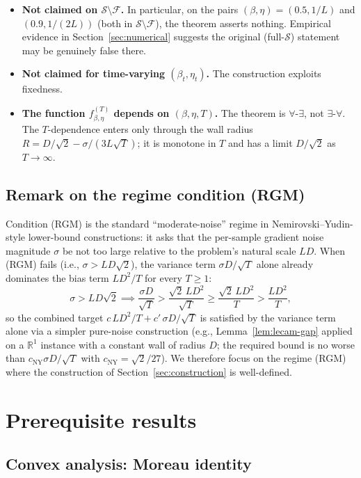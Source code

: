 \documentclass[11pt]{article}
\theoremstyle{definition}
\theoremstyle{remark}
\begin{document}
\begin{itemize}
\item \textbf{Not claimed on $\mathcal{S}\setminus\mathcal{F}$.} In particular, on the pairs $(\beta, \eta) = (0.5, 1/L)$ and $(0.9, 1/(2L))$ (both in $\mathcal{S}\setminus\mathcal{F}$), the theorem asserts nothing. Empirical evidence in Section~\ref{sec:numerical} suggests the original (full-$\mathcal{S}$) statement may be genuinely false there.
\item \textbf{Not claimed for time-varying $(\beta_t, \eta_t)$.} The construction exploits fixedness.
\item \textbf{The function $f_{\beta,\eta}^{(T)}$ depends on $(\beta, \eta, T)$.} The theorem is $\forall$-$\exists$, not $\exists$-$\forall$. The $T$-dependence enters only through the wall radius $R = D/\sqrt 2 - \sigma/(3L\sqrt T)$; it is monotone in $T$ and has a limit $D/\sqrt 2$ as $T \to \infty$.
\end{itemize}

\subsection{Remark on the regime condition (RGM)}

Condition (RGM) is the standard ``moderate-noise'' regime in Nemirovski--Yudin-style lower-bound constructions: it asks that the per-sample gradient noise magnitude $\sigma$ be not too large relative to the problem's natural scale $LD$. When (RGM) fails (i.e., $\sigma > LD\sqrt 2$), the variance term $\sigma D/\sqrt T$ alone already dominates the bias term $LD^2/T$ for every $T \geq 1$:
\[
  \sigma > LD\sqrt 2 \implies \frac{\sigma D}{\sqrt T} > \frac{\sqrt 2\, L D^2}{\sqrt T} \geq \frac{\sqrt 2\, L D^2}{T} > \frac{LD^2}{T},
\]
so the combined target $c\,LD^2/T + c'\,\sigma D/\sqrt T$ is satisfied by the variance term alone via a simpler pure-noise construction (e.g., Lemma~\ref{lem:lecam-gap} applied on a $\mathbb{R}^1$ instance with a constant wall of radius $D$; the required bound is no worse than $c_{\mathrm{NY}}\sigma D/\sqrt T$ with $c_{\mathrm{NY}} = \sqrt 2/27$). We therefore focus on the regime (RGM) where the construction of Section~\ref{sec:construction} is well-defined.

\section{Prerequisite results}
\label{sec:prereq}

\subsection{Convex analysis: Moreau identity}
\end{document}
